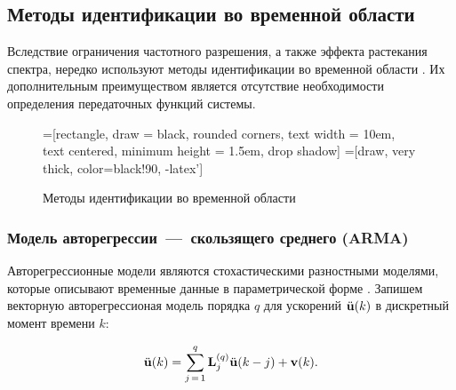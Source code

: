 \subsection{Методы идентификации во временной области}

Вследствие ограничения частотного разрешения, а также эффекта растекания спектра, нередко используют методы идентификации во временной области . Их дополнительным преимуществом является отсутствие необходимости определения передаточных функций системы.

\begin{figure}[H]
	\centering
	=[rectangle, draw = black, rounded corners, text width = 10em, text centered, minimum height = 1.5em, drop shadow]
	=[draw, very thick, color=black!90, -latex']
	\caption{Методы идентификации во временной области}\label{fig:schemeTimeDomainOMA}
\end{figure}

\subsubsection{Модель авторегрессии~---~скользящего среднего (ARMA)}

Авторегрессионные модели являются стохастическими разностными моделями, которые описывают временные данные в параметрической форме \cite{lib:oma:Chen}. Запишем векторную авторегрессионая модель порядка $ q $ для ускорений $ \ddot{\mathbf{u}}(k) $ в дискретный момент времени $ k $:

\begin{equation}
	\ddot{\mathbf{u}}(k) = \sum_{j\,=\,1} ^ q \mathbf{L}_j^{(q)} \ddot{\mathbf{u}}(k - j) + \mathbf{v}(k). \label{eq:representationVAR}
\end{equation}

